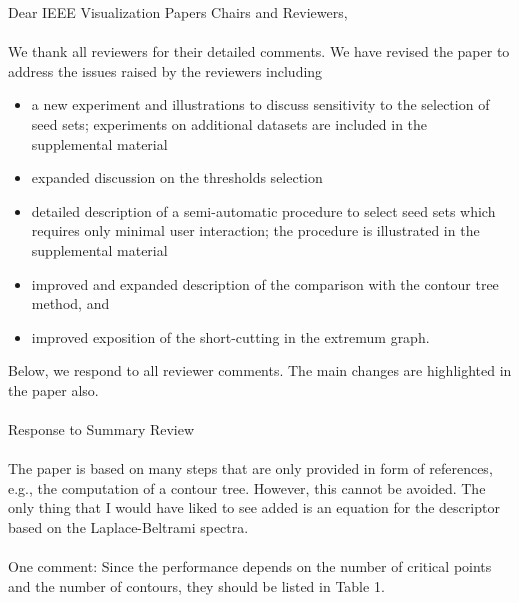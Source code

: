 \documentclass[10pt]{article}
\title{}
\date{}
\begin{document}
\noindent Dear IEEE Visualization Papers Chairs and Reviewers,\\\\

We thank all reviewers for their detailed comments. We have revised the paper to address the issues raised by the reviewers including 
\begin{itemize}
\item a new experiment and illustrations to discuss sensitivity to the selection of seed sets;	experiments 
	on additional datasets are included in the supplemental material
\item expanded discussion on the thresholds selection
\item detailed description of a semi-automatic procedure to select seed sets which requires only minimal 
	user interaction; the procedure is illustrated in the supplemental material
\item improved and expanded description of the comparison with the contour tree method, and
\item improved exposition of the short-cutting in the extremum graph.
\end{itemize} 
Below, we respond to all reviewer comments. The main changes are highlighted in the paper also.\\\\

{\noindent \LARGE Response to Summary Review}\\\\

The paper is based on many steps that are only provided in form of
   references, e.g., the computation of a contour tree. However, this cannot
   be avoided. The only thing that I would have liked to see added is an
   equation for the descriptor based on the Laplace-Beltrami spectra.\\\\

   One comment:
   Since the performance depends on the number of critical points and the
   number of contours, they should be listed in Table 1.
\end{document}
